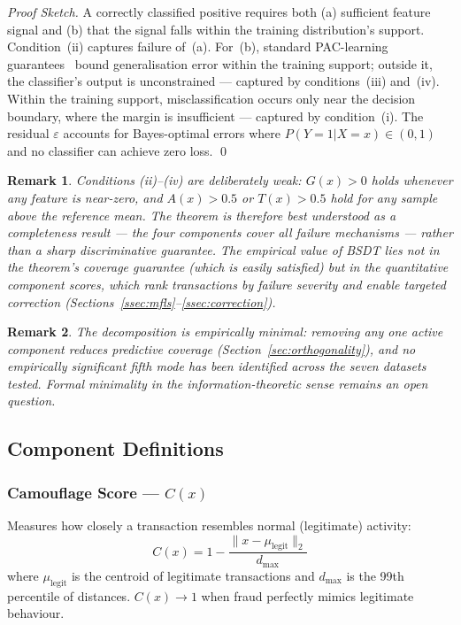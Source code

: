 \documentclass[journal]{IEEEtran}
\newtheorem{remark}{Remark}
\begin{document}
\begin{proof}[Proof Sketch]
A correctly classified positive requires both (a) sufficient feature signal and (b) that the signal falls within the training distribution's support. Condition~(ii) captures failure of~(a). For~(b), standard PAC-learning guarantees~\cite{valiant1984,devroye1996} bound generalisation error within the training support; outside it, the classifier's output is unconstrained --- captured by conditions~(iii) and~(iv). Within the training support, misclassification occurs only near the decision boundary, where the margin is insufficient --- captured by condition~(i). The residual $\varepsilon$ accounts for Bayes-optimal errors where $P(Y{=}1|X{=}x) \in (0,1)$ and no classifier can achieve zero loss. \qed
\end{proof}

\begin{remark}
Conditions (ii)--(iv) are deliberately weak: $G(x) > 0$ holds whenever any feature is near-zero, and $A(x) > 0.5$ or $T(x) > 0.5$ hold for any sample above the reference mean. The theorem is therefore best understood as a \emph{completeness} result --- the four components \emph{cover} all failure mechanisms --- rather than a sharp discriminative guarantee. The empirical value of BSDT lies not in the theorem's coverage guarantee (which is easily satisfied) but in the \emph{quantitative} component scores, which rank transactions by failure severity and enable targeted correction (Sections~\ref{ssec:mfls}--\ref{ssec:correction}).
\end{remark}

\begin{remark}
The decomposition is \emph{empirically minimal}: removing any one active component reduces predictive coverage (Section~\ref{sec:orthogonality}), and no empirically significant fifth mode has been identified across the seven datasets tested. Formal minimality in the information-theoretic sense remains an open question.
\end{remark}

\subsection{Component Definitions}
\label{ssec:components}

\subsubsection{Camouflage Score --- $C(x)$}
Measures how closely a transaction resembles normal (legitimate) activity:
\begin{equation}
  C(x) = 1 - \frac{\|x - \mu_{\text{legit}}\|_2}{d_{\max}}
  \label{eq:camouflage}
\end{equation}
where $\mu_{\text{legit}}$ is the centroid of legitimate transactions and $d_{\max}$ is the 99th percentile of distances. $C(x) \to 1$ when fraud perfectly mimics legitimate behaviour.
\end{document}
